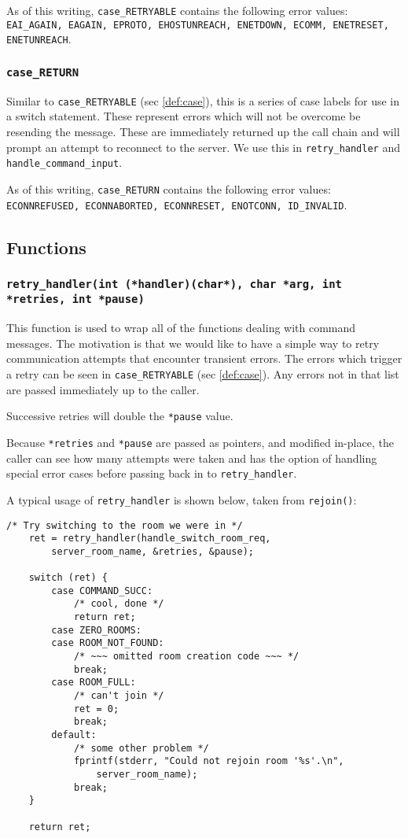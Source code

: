 \documentclass[12pt]{article}
\newcommand{\mono}[1]{\texttt{#1}}
\begin{document}
As of this writing, \mono{case\_RETRYABLE} contains the following error values:
\mono{EAI\_AGAIN, EAGAIN, EPROTO, EHOSTUNREACH, ENETDOWN, ECOMM, ENETRESET,
ENETUNREACH}.

\subsubsection{\mono{case\_RETURN}}
Similar to \mono{case\_RETRYABLE} (sec \ref{def:case}), this is a series of case
labels for use in a switch statement. These represent errors which will not
be overcome be resending the message. These are immediately returned up the
call chain and will prompt an attempt to reconnect to the server. We use
this in \mono{retry\_handler} and \mono{handle\_command\_input}.

As of this writing, \mono{case\_RETURN} contains the following error values:
\mono{ECONNREFUSED, ECONNABORTED, ECONNRESET, ENOTCONN, ID\_INVALID}.

\subsection{Functions}

\subsubsection[\mono{retry\_handler}]{\mono{retry\_handler(int (*handler)(char*), char *arg, int *retries, int *pause)}}
\label{func:retry}
This function is used to wrap all of the functions dealing with command
messages. The motivation is that we would like to have a simple way to 
retry communication attempts that encounter transient errors. The errors
which trigger a retry can be seen in \mono{case\_RETRYABLE}
(sec \ref{def:case}). Any errors not in that list are passed immediately
up to the caller.

Successive retries will double the \mono{*pause} value.

Because \mono{*retries} and \mono{*pause} are passed as pointers, and
modified in-place, the caller can see
how many attempts were taken and has the option of handling special error
cases before passing back in to \mono{retry\_handler}.

A typical usage of \mono{retry\_handler} is shown below, taken from
\mono{rejoin()}:
\begin{lstlisting}[caption=Excerpt from rejoin()]
    /* Try switching to the room we were in */
    ret = retry_handler(handle_switch_room_req,
        server_room_name, &retries, &pause);

    switch (ret) {
        case COMMAND_SUCC:
            /* cool, done */
            return ret;
        case ZERO_ROOMS:
        case ROOM_NOT_FOUND:
            /* ~~~ omitted room creation code ~~~ */
            break;
        case ROOM_FULL:
            /* can't join */
            ret = 0;
            break;
        default:
            /* some other problem */
            fprintf(stderr, "Could not rejoin room '%s'.\n",
                server_room_name);
            break;
    }

    return ret;
\end{lstlisting}
\end{document}
